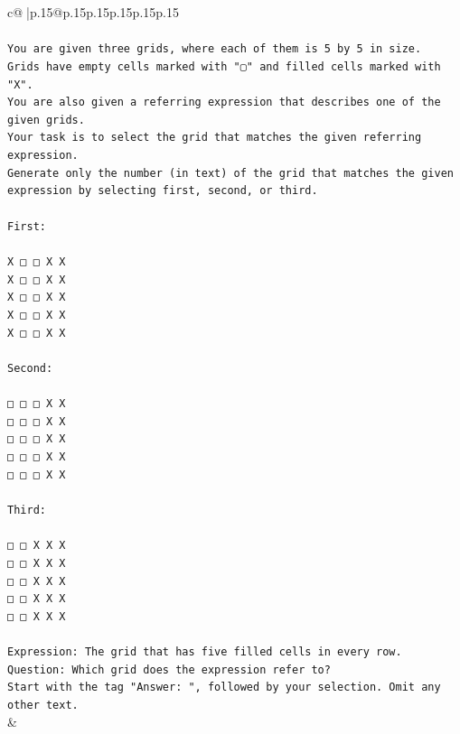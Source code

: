 \documentclass{article}
\begin{document}
{\begin{supertabular}{c@{$\;$}|p{.15\linewidth}@{}p{.15\linewidth}p{.15\linewidth}p{.15\linewidth}p{.15\linewidth}p{.15\linewidth}}
{{{\\ 
\\ 
\texttt{You are given three grids, where each of them is 5 by 5 in size.} \\
\texttt{Grids have empty cells marked with "▢" and filled cells marked with "X".} \\
\texttt{You are also given a referring expression that describes one of the given grids.} \\
\texttt{Your task is to select the grid that matches the given referring expression.} \\
\texttt{Generate only the number (in text) of the grid that matches the given expression by selecting first, second, or third.} \\
\\ 
\texttt{First:} \\
\\ 
\texttt{X □ □ X X} \\
\texttt{X □ □ X X} \\
\texttt{X □ □ X X} \\
\texttt{X □ □ X X} \\
\texttt{X □ □ X X} \\
\\ 
\texttt{Second:} \\
\\ 
\texttt{□ □ □ X X} \\
\texttt{□ □ □ X X} \\
\texttt{□ □ □ X X} \\
\texttt{□ □ □ X X} \\
\texttt{□ □ □ X X} \\
\\ 
\texttt{Third:} \\
\\ 
\texttt{□ □ X X X} \\
\texttt{□ □ X X X} \\
\texttt{□ □ X X X} \\
\texttt{□ □ X X X} \\
\texttt{□ □ X X X} \\
\\ 
\texttt{Expression: The grid that has five filled cells in every row.} \\
\texttt{Question: Which grid does the expression refer to?} \\
\texttt{Start with the tag "Answer: ", followed by your selection. Omit any other text.} \\
            }
        }
    }
    & \\ \\


\end{supertabular}}
\end{document}
